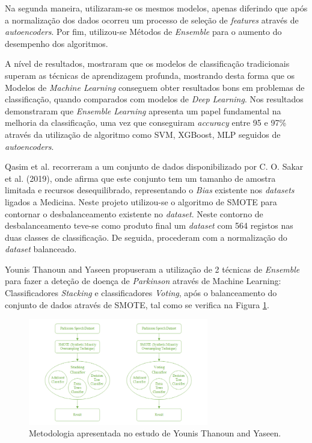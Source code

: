 \documentclass[12pt,a4paper,twoside]{report}
\begin{document}
{Na segunda maneira, utilizaram-se os mesmos modelos, apenas diferindo que após a normalização dos dados ocorreu um processo de seleção de \textit{features} através de \textit{autoencoders}. Por fim, utilizou-se Métodos de \textit{Ensemble} para o aumento do desempenho dos algoritmos. 

A nível de resultados, mostraram que os modelos de classificação tradicionais superam as técnicas de aprendizagem profunda, mostrando desta forma que os Modelos de \textit{Machine Learning} conseguem obter resultados bons em problemas de classificação, quando comparados com modelos de \textit{Deep Learning}. Nos resultados demonstraram que \textit{Ensemble Learning} apresenta um papel fundamental na melhoria da classificação, uma vez que conseguiram \textit{accuracy} entre 95 e 97\% através da utilização de algoritmo como \gls{SVM}, \Gls{XGBoost}, \gls{MLP} seguidos de \textit{autoencoders}.

Qasim et al. \cite{medicina57111217} recorreram a um conjunto de dados
disponibilizado por C. O. Sakar et al. (2019), onde afirma que este conjunto tem um tamanho de amostra limitada e recursos desequilibrado, representando o \textit{Bias} existente nos \textit{datasets} ligados a Medicina. Neste projeto utilizou-se o algoritmo de \gls{SMOTE} para contornar o desbalanceamento existente no \textit{dataset}. Neste contorno de desbalanceamento teve-se como produto final um \textit{dataset} com 564 registos nas duas classes de classificação. De seguida, procederam com a normalização do \textit{dataset} balanceado.

Younis Thanoun and Yaseen \cite{thanoun} propuseram a utilização de 2 técnicas de \textit{Ensemble} para fazer a deteção de doença de \textit{Parkinson} através de Machine Learning: Classificadores \textit{Stacking} e classificadores \textit{Voting}, após o balanceamento do conjunto de dados através de \gls{SMOTE}, tal como se verifica na Figura \ref{fig:thanoun}.

\begin{figure}[H]
    \centering
    \includegraphics[width=0.7\textwidth]{imagens/thanoun.png}
    \caption{Metodologia apresentada no estudo de Younis Thanoun and Yaseen\cite{thanoun}.}
    \label{fig:thanoun}
\end{figure}

}
\end{document}
